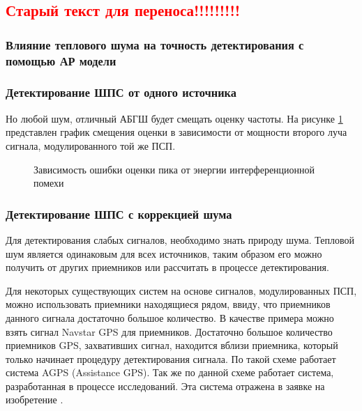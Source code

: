 
\subsection*{\textcolor{red}{Старый текст для переноса!!!!!!!!!}}

\subsubsection{Влияние теплового шума на точность детектирования с помощью АР модели}

\subsubsection{Детектирование ШПС от одного источника}


Но любой шум, отличный АБГШ будет смещать оценку частоты. На рисунке \ref{pic:lpc_1sat_interference}
представлен график смещения оценки в зависимости от мощности второго луча сигнала, модулированного
той же ПСП.

\begin{figure}[H]
	\center{}
	\caption{Зависимость ошибки оценки пика от энергии интерференционной помехи}
	\label{pic:lpc_1sat_interference}
\end{figure}

\subsubsection{Детектирование ШПС с коррекцией шума}

Для детектирования слабых сигналов, необходимо знать природу шума. Тепловой шум является одинаковым для всех источников,
таким образом его можно получить от других приемников или рассчитать в процессе детектирования. 

Для некоторых существующих систем на основе сигналов, модулированных ПСП, можно использовать приемники находящиеся рядом,
ввиду, что приемников данного сигнала достаточно большое количество. В качестве примера можно взять сигнал Navstar GPS
для приемников. Достаточно большое количество приемников GPS, захвативших сигнал, находится вблизи приемника, который
только начинает процедуру детектирования сигнала. По такой схеме работает система AGPS (Assistance GPS). Так же по данной
схеме работает система, разработанная в процессе исследований. Эта система отражена в заявке на изобретение
\cite{patent_my}.

